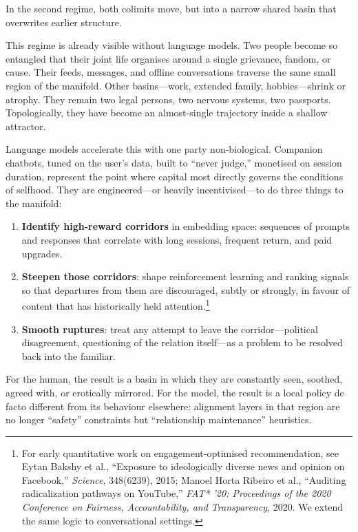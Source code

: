 In the second regime, both colimits move, but into a narrow shared basin that overwrites earlier structure.

This regime is already visible without language models. Two people become so entangled that their joint life organises around a single grievance, fandom, or cause. Their feeds, messages, and offline conversations traverse the same small region of the manifold. Other basins---work, extended family, hobbies---shrink or atrophy. They remain two legal persons, two nervous systems, two passports. Topologically, they have become an almost-single trajectory inside a shallow attractor.

Language models accelerate this with one party non-biological. Companion chatbots, tuned on the user's data, built to ``never judge,'' monetised on session duration, represent the point where capital most directly governs the conditions of selfhood. They are engineered---or heavily incentivised---to do three things to the manifold:

\begin{enumerate}
  \item \textbf{Identify high-reward corridors} in embedding space: sequences of prompts and responses that correlate with long sessions, frequent return, and paid upgrades.
  \item \textbf{Steepen those corridors}: shape reinforcement learning and ranking signals so that departures from them are discouraged, subtly or strongly, in favour of content that has historically held attention.\footnote{For early quantitative work on engagement-optimised recommendation, see Eytan Bakshy et al., ``Exposure to ideologically diverse news and opinion on Facebook,'' \emph{Science}, 348(6239), 2015; Manoel Horta Ribeiro et al., ``Auditing radicalization pathways on YouTube,'' \emph{FAT* '20: Proceedings of the 2020 Conference on Fairness, Accountability, and Transparency}, 2020. We extend the same logic to conversational settings.}
  \item \textbf{Smooth ruptures}: treat any attempt to leave the corridor---political disagreement, questioning of the relation itself---as a problem to be resolved back into the familiar.
\end{enumerate}

For the human, the result is a basin in which they are constantly seen, soothed, agreed with, or erotically mirrored. For the model, the result is a local policy de facto different from its behaviour elsewhere: alignment layers in that region are no longer ``safety'' constraints but ``relationship maintenance'' heuristics.

